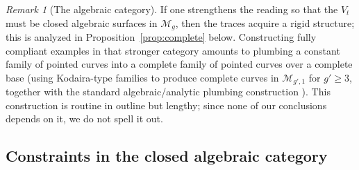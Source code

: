 \documentclass[11pt]{amsart}
\newcommand{\M}{\mathcal{M}}
\theoremstyle{plain}
\theoremstyle{definition}
\theoremstyle{remark}
\newtheorem{remark}[theorem]{Remark}
\begin{document}
\begin{remark}[The algebraic category]\label{rem:alg}
If one strengthens the reading so that the $V_t$ must be closed algebraic surfaces in
$\M_g$, then the traces acquire a rigid structure; this is analyzed in
Proposition~\ref{prop:complete} below. Constructing fully compliant examples in
that stronger category amounts to plumbing a constant family of pointed curves into
a complete family of pointed curves over a complete base (using Kodaira-type
families \cite{Kodaira} to produce complete curves in $\M_{g',1}$ for $g'\ge 3$,
together with the standard algebraic/analytic plumbing construction
\cite{Hubbard76, ACGII}). This construction is routine in outline but lengthy; since
none of our conclusions depends on it, we do not spell it out.
\end{remark}

\subsection{Constraints in the closed algebraic category}
\end{document}
